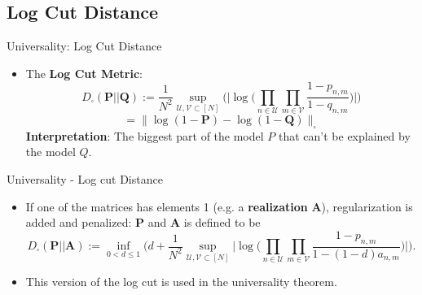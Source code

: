 \documentclass{beamer}
\begin{document}
\subsection{Log Cut Distance}
\begin{frame}{Universality: Log Cut Distance}
    \begin{itemize}[itemsep=1em, label=\textbullet]
    \item The \textbf{Log Cut Metric}:
    \[
        D_{\square}(\mathbf{P} || \mathbf{Q}):=  \frac{1}{N^2}\sup_{\mathcal{U},\mathcal{V}\subset[N]}\Bigg(\Big|\log\Big(\prod_{n\in \mathcal{U}}\prod_{m\in \mathcal{V}}
\frac{1-p_{n,m}}{1-q_{n,m}}\Big)\Big|\Bigg)\]
  \[= \|\log(1-\mathbf{P})- \log(1-\mathbf{Q}) \|_{\square}\]
\textbf{Interpretation}: The biggest part of the model $P$ that can't be explained by the model $Q$.
    
    
    \end{itemize}
\end{frame}

\begin{frame}{Universality - Log cut Distance}
\begin{itemize}[itemsep=2em, label=\textbullet]
   \item If one of the matrices has elements 1 (e.g. a \textbf{realization} $\mathbf{A}$), regularization is added and penalized:
\small
$\mathbf{P}$ and $\mathbf{A}$ is defined to be
    \[
    D_{\square}(\mathbf{P} || \mathbf{A}):= 
    \inf_{0< d\leq1} \Bigg( d+ \frac{1}{N^2}\sup_{\mathcal{U},\mathcal{V}\subset[N]}\Big|\log\Big(\prod_{n\in \mathcal{U}}\prod_{m\in \mathcal{V}}
\frac{1-p_{n,m}}{1-(1-d)a_{n,m}}\Big)\Big|\Bigg).
    \]
    \item This version of the log cut is used in the universality theorem.
\end{itemize} 

    
    

\end{frame}
\end{document}
